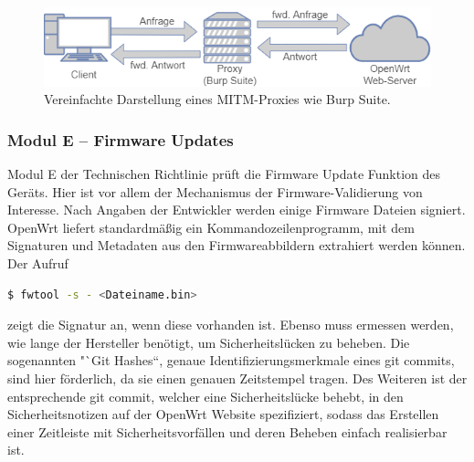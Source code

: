 \documentclass[a4paper]{book}
\begin{document}
\begin{large}
\begin{onehalfspace}
\begin{figure}[h]
\begin{center}
\includegraphics[scale=0.5]{images/proxy} 
\caption{Vereinfachte Darstellung eines MITM-Proxies wie Burp Suite.}
\label{fig:Proxy}
\end{center}
\end{figure}	

\end{onehalfspace}


\subsubsection{Modul E – Firmware Updates}
\begin{onehalfspace}
Modul E der Technischen Richtlinie prüft die Firmware Update Funktion des Geräts. Hier ist vor allem der Mechanismus der Firmware-Validierung von Interesse. Nach Angaben der Entwickler werden einige Firmware Dateien signiert. OpenWrt liefert standardmäßig ein Kommandozeilenprogramm, mit dem Signaturen und Metadaten aus den Firmwareabbildern extrahiert werden können. Der Aufruf \\	 

\begin{lstlisting}[language=sh,caption={Nutzung des in OpenWrt integrierten Programmes "`fwtool“ zur Extraktion von Signaturen aus OpenWrt Firmware-Abbildern}]
$ fwtool -s - <Dateiname.bin> 
\end{lstlisting}

\noindent zeigt die Signatur an, wenn diese vorhanden ist. Ebenso muss ermessen werden, wie lange der Hersteller benötigt, um Sicherheitslücken zu beheben. Die sogenannten "`Git Hashes“, genaue Identifizierungsmerkmale eines git commits, sind hier förderlich, da sie einen genauen Zeitstempel tragen. Des Weiteren ist der entsprechende git commit, welcher eine Sicherheitslücke behebt, in den Sicherheitsnotizen auf der OpenWrt Website spezifiziert, sodass das Erstellen einer Zeitleiste mit Sicherheitsvorfällen und deren Beheben einfach realisierbar ist. 	 
\end{onehalfspace}




\end{large}
\end{document}
